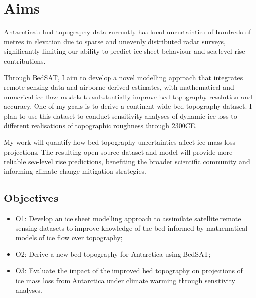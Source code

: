 \chapter{Aims}
Antarctica's bed topography data currently has local uncertainties of hundreds of metres in elevation due to sparse and unevenly distributed radar surveys, significantly limiting our ability to predict ice sheet behaviour and sea level rise contributions. 

Through BedSAT, I aim to develop a novel modelling approach that integrates remote sensing data and airborne-derived estimates, with mathematical and numerical ice flow models to substantially improve bed topography resolution and accuracy. One of my goals is to derive a continent-wide bed topography dataset. I plan to use this dataset to conduct sensitivity analyses of dynamic ice loss to different realisations of topographic roughness through 2300CE.

My work will quantify how bed topography uncertainties affect ice mass loss projections. The resulting open-source dataset and model will provide more reliable sea-level rise predictions, benefiting the broader scientific community and informing climate change mitigation strategies.

\section{Objectives}
\begin{itemize}
    \item{O1:} Develop an ice sheet modelling approach to assimilate satellite remote sensing datasets to improve knowledge of the bed informed by mathematical models of ice flow over topography;
    \item{O2:} Derive a new bed topography for Antarctica using BedSAT;
    \item{O3:} Evaluate the impact of the improved bed topography on projections of ice mass loss from Antarctica under climate warming through sensitivity analyses. 
\end{itemize}